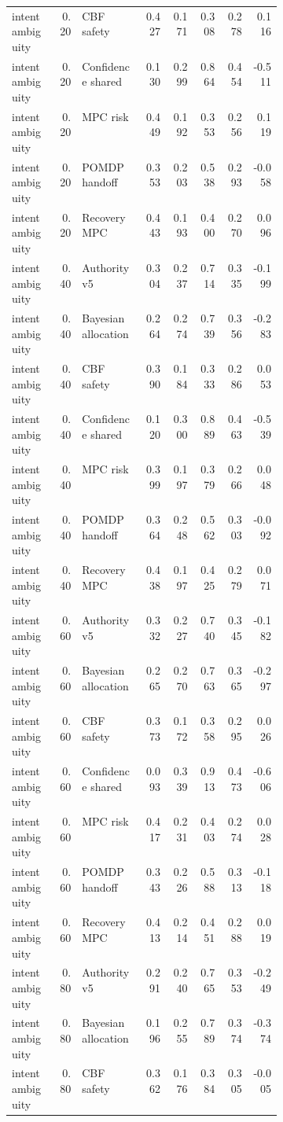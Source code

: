 \documentclass{article}
\begin{document}
\begin{center}
\begin{longtable}{p{0.17\linewidth}rp{0.23\linewidth}rrrrr}
intent ambiguity & 0.20 & CBF safety & 0.427 & 0.171 & 0.308 & 0.278 & 0.116\\
intent ambiguity & 0.20 & Confidence shared & 0.130 & 0.299 & 0.864 & 0.454 & -0.511\\
intent ambiguity & 0.20 & MPC risk & 0.449 & 0.192 & 0.353 & 0.256 & 0.119\\
intent ambiguity & 0.20 & POMDP handoff & 0.353 & 0.203 & 0.538 & 0.293 & -0.058\\
intent ambiguity & 0.20 & Recovery MPC & 0.443 & 0.193 & 0.400 & 0.270 & 0.096\\
intent ambiguity & 0.40 & Authority v5 & 0.304 & 0.237 & 0.714 & 0.335 & -0.199\\
intent ambiguity & 0.40 & Bayesian allocation & 0.264 & 0.274 & 0.739 & 0.356 & -0.283\\
intent ambiguity & 0.40 & CBF safety & 0.390 & 0.184 & 0.333 & 0.286 & 0.053\\
intent ambiguity & 0.40 & Confidence shared & 0.120 & 0.300 & 0.889 & 0.463 & -0.539\\
intent ambiguity & 0.40 & MPC risk & 0.399 & 0.197 & 0.379 & 0.266 & 0.048\\
intent ambiguity & 0.40 & POMDP handoff & 0.364 & 0.248 & 0.562 & 0.303 & -0.092\\
intent ambiguity & 0.40 & Recovery MPC & 0.438 & 0.197 & 0.425 & 0.279 & 0.071\\
intent ambiguity & 0.60 & Authority v5 & 0.332 & 0.227 & 0.740 & 0.345 & -0.182\\
intent ambiguity & 0.60 & Bayesian allocation & 0.265 & 0.270 & 0.763 & 0.365 & -0.297\\
intent ambiguity & 0.60 & CBF safety & 0.373 & 0.172 & 0.358 & 0.295 & 0.026\\
intent ambiguity & 0.60 & Confidence shared & 0.093 & 0.339 & 0.913 & 0.473 & -0.606\\
intent ambiguity & 0.60 & MPC risk & 0.417 & 0.231 & 0.403 & 0.274 & 0.028\\
intent ambiguity & 0.60 & POMDP handoff & 0.343 & 0.226 & 0.588 & 0.313 & -0.118\\
intent ambiguity & 0.60 & Recovery MPC & 0.413 & 0.214 & 0.451 & 0.288 & 0.019\\
intent ambiguity & 0.80 & Authority v5 & 0.291 & 0.240 & 0.765 & 0.353 & -0.249\\
intent ambiguity & 0.80 & Bayesian allocation & 0.196 & 0.255 & 0.789 & 0.374 & -0.374\\
intent ambiguity & 0.80 & CBF safety & 0.362 & 0.176 & 0.384 & 0.305 & -0.005\\

\end{longtable}
\end{center}
\end{document}
